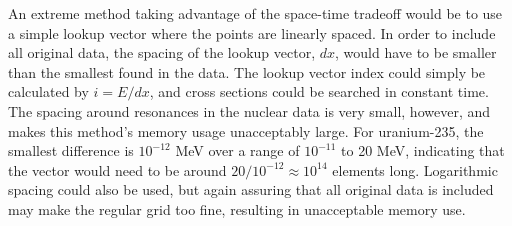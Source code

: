 An extreme method taking advantage of the space-time tradeoff would be to use a simple lookup vector where the points are linearly spaced.  In order to include all original data, the spacing of the lookup vector, $dx$, would have to be smaller than the smallest found in the data.  The lookup vector index could simply be calculated by $i=E/dx$, and cross sections could be searched in constant time.  The spacing around resonances in the nuclear data is very small, however, and makes this method's memory usage unacceptably large.  For uranium-235, the smallest difference is $10^{-12}$ MeV over a range of $10^{-11}$ to 20 MeV, indicating that the vector would need to be around $20/10^{-12} \approx 10^{14}$ elements long.  Logarithmic spacing could also be used, but again assuring that all original data is included may make the regular grid too fine, resulting in unacceptable memory use.

 

